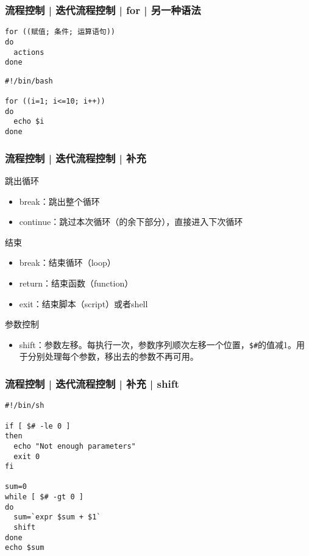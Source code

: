 \begin{frame}[fragile]
  \frametitle{流程控制 | 迭代流程控制 | for | \alert{另一种语法}}
\begin{lstlisting}
for ((赋值; 条件; 运算语句))
do
  actions
done
\end{lstlisting}
\pause
\begin{lstlisting}
#!/bin/bash

for ((i=1; i<=10; i++))
do
  echo $i
done
\end{lstlisting}
\end{frame}

\begin{frame}[fragile]
  \frametitle{流程控制 | 迭代流程控制 | \alert{补充}}
  \begin{block}{跳出循环}
    \begin{itemize}
      \item break：跳出整个循环
      \item continue：跳过本次循环（的余下部分），直接进入下次循环
    \end{itemize}
  \end{block}
  \pause
  \begin{block}{结束}
    \begin{itemize}
      \item break：结束循环（loop）
      \item return：结束函数（function）
      \item exit：结束脚本（script）或者shell
    \end{itemize}
  \end{block}
  \pause
  \begin{block}{参数控制}
    \begin{itemize}
      \item shift：参数左移。每执行一次，参数序列顺次左移一个位置，\verb|$#|的值减1。用于分别处理每个参数，移出去的参数不再可用。
    \end{itemize}
  \end{block}
\end{frame}

\begin{frame}[fragile]
  \frametitle{流程控制 | 迭代流程控制 | 补充 | shift}
\begin{lstlisting}
#!/bin/sh

if [ $# -le 0 ]
then
  echo "Not enough parameters"
  exit 0
fi

sum=0
while [ $# -gt 0 ]
do
  sum=`expr $sum + $1`
  shift
done
echo $sum
\end{lstlisting}
\end{frame}

